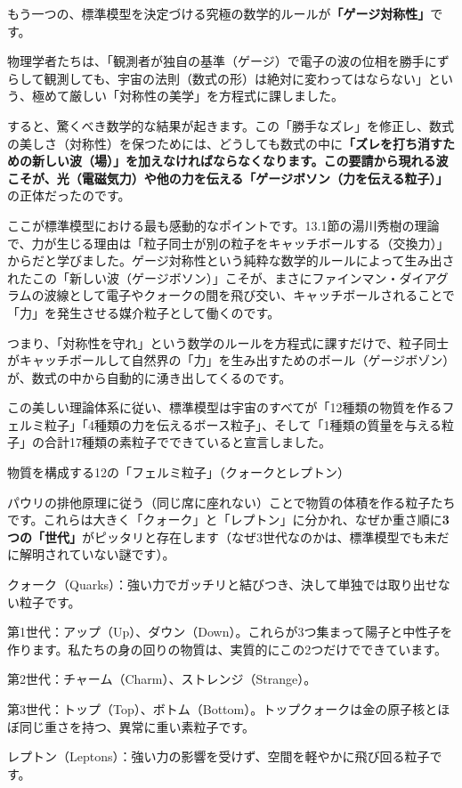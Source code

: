 もう一つの、標準模型を決定づける究極の数学的ルールが\textbf{「ゲージ対称性」}です。

物理学者たちは、「観測者が独自の基準（ゲージ）で電子の波の位相を勝手にずらして観測しても、宇宙の法則（数式の形）は絶対に変わってはならない」という、極めて厳しい「対称性の美学」を方程式に課しました。

すると、驚くべき数学的な結果が起きます。この「勝手なズレ」を修正し、数式の美しさ（対称性）を保つためには、どうしても数式の中に\textbf{「ズレを打ち消すための新しい波（場）」を加えなければならなくなります。この要請から現れる波こそが、光（電磁気力）や他の力を伝える「ゲージボソン（力を伝える粒子）」}の正体だったのです。

ここが標準模型における最も感動的なポイントです。13.1節の湯川秀樹の理論で、力が生じる理由は「粒子同士が別の粒子をキャッチボールする（交換力）」からだと学びました。ゲージ対称性という純粋な数学的ルールによって生み出されたこの「新しい波（ゲージボソン）」こそが、まさにファインマン・ダイアグラムの波線として電子やクォークの間を飛び交い、キャッチボールされることで「力」を発生させる媒介粒子として働くのです。

つまり、「対称性を守れ」という数学のルールを方程式に課すだけで、粒子同士がキャッチボールして自然界の「力」を生み出すためのボール（ゲージボゾン）が、数式の中から自動的に湧き出してくるのです。

この美しい理論体系に従い、標準模型は宇宙のすべてが「12種類の物質を作るフェルミ粒子」「4種類の力を伝えるボース粒子」、そして「1種類の質量を与える粒子」の合計17種類の素粒子でできていると宣言しました。

物質を構成する12の「フェルミ粒子」（クォークとレプトン）

パウリの排他原理に従う（同じ席に座れない）ことで物質の体積を作る粒子たちです。これらは大きく「クォーク」と「レプトン」に分かれ、なぜか重さ順に\textbf{3つの「世代」}がピッタリと存在します（なぜ3世代なのかは、標準模型でも未だに解明されていない謎です）。

クォーク（Quarks）：強い力でガッチリと結びつき、決して単独では取り出せない粒子です。

第1世代：アップ（Up）、ダウン（Down）。これらが3つ集まって陽子と中性子を作ります。私たちの身の回りの物質は、実質的にこの2つだけでできています。

第2世代：チャーム（Charm）、ストレンジ（Strange）。

第3世代：トップ（Top）、ボトム（Bottom）。トップクォークは金の原子核とほぼ同じ重さを持つ、異常に重い素粒子です。

レプトン（Leptons）：強い力の影響を受けず、空間を軽やかに飛び回る粒子です。

